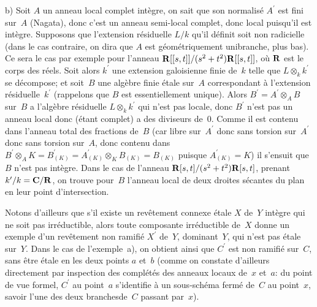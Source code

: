 b) Soit $A$ un anneau local complet int\`egre, on sait que son
normalis\'e $A^\prime$ est fini
sur~$A$ (Nagata), donc c'est un anneau semi-local complet, donc local
puisqu'il est int\`egre. Supposons que l'extension r\'esiduelle
$L/k$ qu'il d\'efinit soit non radicielle (dans le cas contraire, on
dira que $A$ est g\'eom\'etriquement unibranche, \cf plus bas). Ce
sera le cas par exemple pour l'anneau
$\mathbf{R}[[s,t]]/(s^2+t^2)\mathbf{R}[[s,t]]$,
o\`u $\mathbf{R}$ est le corps
des r\'eels. Soit alors $k^\prime$ une extension galoisienne finie
de~$k$ telle que $L \otimes_k k^\prime$ se d\'ecompose; et soit~$B$
une alg\`ebre finie \'etale sur~$A$ correspondant \`a
l'extension r\'esiduelle~$k^\prime$ (rappelons que $B$ est
essentiellement unique). Alors $B^\prime = A^\prime \otimes_A B$
sur~$B$ a l'alg\`ebre r\'esiduelle $L \otimes_k k^\prime$ qui
n'est pas locale, donc $B^\prime$ n'est pas un anneau local donc
(\'etant complet) a des diviseurs de~$0$. Comme il est contenu dans
l'anneau total des fractions de~$B$ (car libre sur~$A^\prime$ donc
sans torsion sur~$A^\prime$ donc sans torsion sur~$A$, donc contenu
dans $B^\prime \otimes_A K = B^\prime_{(K)} = A^\prime_{(K)} \otimes_K
B_{(K)} = B_{(K)}$ puisque $A^\prime_{(K)} = K$) il s'ensuit que $B$
n'est pas int\`egre. Dans le cas de l'anneau
$\mathbf{R}[s,t]/(s^2+t^2)\mathbf{R}[s,t]$, prenant $k^\prime/k=
\mathbf{C}/\mathbf{R}$, on trouve pour~$B$ l'anneau local de deux droites
s\'ecantes du plan en leur point d'intersection.

Notons d'ailleurs que s'il existe un rev\^etement connexe \'etale
$X$ de~$Y$ int\`egre qui ne soit pas irr\'eductible, alors toute
composante irr\'eductible de~$X$ donne un exemple d'un
rev\^etement non ramifi\'e $X^\prime$ de~$Y$, dominant~$Y$, qui
n'est pas \'etale sur~$Y$. Dans le cas de l'exemple~a), on obtient
ainsi que $C^\prime$ est non ramifi\'e sur~$C$, sans \^etre
\'etale en les deux points $a$ et~$b$ (comme on constate d'ailleurs
directement par inspection des compl\'et\'es des anneaux locaux
de~$x$ et~$a$: du point de vue \og formel\fg, $C^\prime$ au point~$a$
s'identifie \`a un sous-sch\'ema ferm\'e de~$C$ au point~$x$,
savoir l'une des deux \og branches\fg de~$C$ passant par~$x$).

